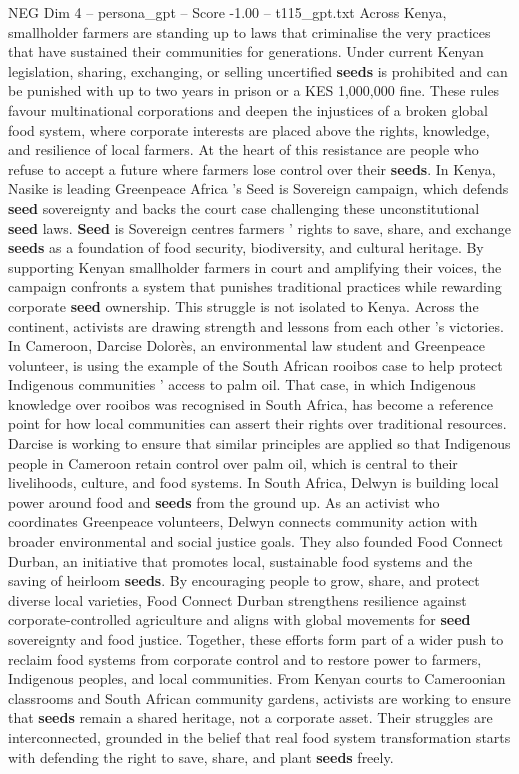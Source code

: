 \begin{textsample}{NEG Dim 4 – persona\_gpt – Score -1.00 – t115\_gpt.txt}  \label{ex:f4_neg_032}
Across Kenya, smallholder farmers are standing up to laws that criminalise the very practices that have sustained their communities for generations.
Under current Kenyan legislation, sharing, exchanging, or selling uncertified \textbf{seeds} is prohibited and can be punished with up to two years in prison or a KES 1,000,000 fine.
These rules favour multinational corporations and deepen the injustices of a broken global food system, where corporate interests are placed above the rights, knowledge, and resilience of local farmers.
At the heart of this resistance are people who refuse to accept a future where farmers lose control over their \textbf{seeds}.
In Kenya, Nasike is leading Greenpeace Africa ’s Seed is Sovereign campaign, which defends \textbf{seed} sovereignty and backs the court case challenging these unconstitutional \textbf{seed} laws. \textbf{Seed} is Sovereign centres farmers ’ rights to save, share, and exchange \textbf{seeds} as a foundation of food security, biodiversity, and cultural heritage.
By supporting Kenyan smallholder farmers in court and amplifying their voices, the campaign confronts a system that punishes traditional practices while rewarding corporate \textbf{seed} ownership.
This struggle is not isolated to Kenya.
Across the continent, activists are drawing strength and lessons from each other ’s victories.
In Cameroon, Darcise Dolorès, an environmental law student and Greenpeace volunteer, is using the example of the South African rooibos case to help protect Indigenous communities ’ access to palm oil.
That case, in which Indigenous knowledge over rooibos was recognised in South Africa, has become a reference point for how local communities can assert their rights over traditional resources.
Darcise is working to ensure that similar principles are applied so that Indigenous people in Cameroon retain control over palm oil, which is central to their livelihoods, culture, and food systems.
In South Africa, Delwyn is building local power around food and \textbf{seeds} from the ground up.
As an activist who coordinates Greenpeace volunteers, Delwyn connects community action with broader environmental and social justice goals.
They also founded Food Connect Durban, an initiative that promotes local, sustainable food systems and the saving of heirloom \textbf{seeds}.
By encouraging people to grow, share, and protect diverse local varieties, Food Connect Durban strengthens resilience against corporate-controlled agriculture and aligns with global movements for \textbf{seed} sovereignty and food justice.
Together, these efforts form part of a wider push to reclaim food systems from corporate control and to restore power to farmers, Indigenous peoples, and local communities.
From Kenyan courts to Cameroonian classrooms and South African community gardens, activists are working to ensure that \textbf{seeds} remain a shared heritage, not a corporate asset.
Their struggles are interconnected, grounded in the belief that real food system transformation starts with defending the right to save, share, and plant \textbf{seeds} freely.

\end{textsample}

